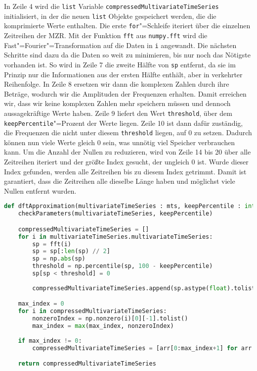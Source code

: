 In Zeile 4 wird die \lstinline|list| Variable \lstinline|compressedMultivariateTimeSeries| initialisiert, in der die neuen \lstinline|list| Objekte gespeichert werden, die die komprimierte Werte enthalten. Die erste \lstinline|for|"=Schleife iteriert über die einzelnen Zeitreihen der \ac{MZR}. Mit der Funktion \lstinline|fft| aus \lstinline|numpy.fft| wird die Fast"=Fourier"=Transformation auf die Daten in \lstinline|i| angewandt. Die nächsten Schritte sind dazu da die Daten so weit zu minimieren, bis nur noch das Nötigste vorhanden ist. So wird in Zeile 7 die zweite Hälfte von \lstinline|sp| entfernt, da sie im Prinzip nur die Informationen aus der ersten Hälfte enthält, aber in verkehrter Reihenfolge. In Zeile 8 ersetzen wir dann die komplexen Zahlen durch ihre Beträge, wodurch wir die Amplituden der Frequenzen erhalten. Damit erreichen wir, dass wir keine komplexen Zahlen mehr speichern müssen und dennoch aussagekräftige Werte haben. Zeile 9 liefert den Wert \lstinline|threshold|, über dem \lstinline|keepPercentile|"=Prozent der Werte liegen. Zeile 10 ist dann dafür zuständig, die Frequenzen die nicht unter diesem \lstinline|threshold| liegen, auf 0 zu setzen. Dadurch können nun viele Werte gleich 0 sein, was unnötig viel Speicher verbrauchen kann. Um die Anzahl der Nullen zu reduzieren, wird von Zeile 14 bis 20 über alle Zeitreihen iteriert und der größte Index gesucht, der ungleich 0 ist. Wurde dieser Index gefunden, werden alle Zeitreihen bis zu diesem Index getrimmt. Damit ist garantiert, dass die Zeitreihen alle dieselbe Länge haben und möglichst viele Nullen entfernt wurden.
\begin{lstlisting}[caption={Diskrete Fourier"=Transformation}, label=lst:diskretefouriertransformation, style=Python, language=Python]
def dftApproximation(multivariateTimeSeries : mts, keepPercentile : int):
    checkParameters(multivariateTimeSeries, keepPercentile)

    compressedMultivariateTimeSeries = []
    for i in multivariateTimeSeries.multivariateTimeSeries:
        sp = fft(i)
        sp = sp[:len(sp) // 2]
        sp = np.abs(sp)
        threshold = np.percentile(sp, 100 - keepPercentile)
        sp[sp < threshold] = 0
        
        compressedMultivariateTimeSeries.append(sp.astype(float).tolist())

    max_index = 0
    for i in compressedMultivariateTimeSeries:
        nonzeroIndex = np.nonzero(i)[0][-1].tolist()
        max_index = max(max_index, nonzeroIndex)
        
    if max_index != 0:
        compressedMultivariateTimeSeries = [arr[0:max_index+1] for arr in compressedMultivariateTimeSeries]

    return compressedMultivariateTimeSeries
\end{lstlisting}